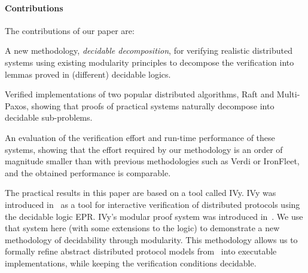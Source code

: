 \paragraph{Contributions}
The contributions of our paper are: %
\begin{compactenum}
\item A new methodology, \emph{decidable decomposition}, for verifying realistic distributed systems
  using existing modularity principles to decompose the verification into lemmas proved in (different) decidable logics.
\item Verified implementations of two popular distributed algorithms, Raft and Multi-Paxos,
  showing that proofs of practical systems naturally decompose into decidable sub-problems.
\item An evaluation of the verification effort and run-time performance of these systems,
  showing that the effort required by our methodology is an order of magnitude smaller than with previous methodologies such as Verdi or IronFleet, and the obtained performance is comparable.
\end{compactenum}

  The practical results in this paper are based on a tool
called IVy. IVy was introduced in~\cite{Ivy} as a tool for interactive
verification of distributed protocols using the decidable logic
EPR. IVy's modular proof system was introduced
in~\cite{ken_fmcad16}. We use that system here (with some extensions
to the logic) to demonstrate a new methodology of decidability through
modularity. This methodology allows us to formally refine abstract
distributed protocol models from~\cite{oopsla17-epr} into executable
implementations, while keeping the verification conditions decidable.

